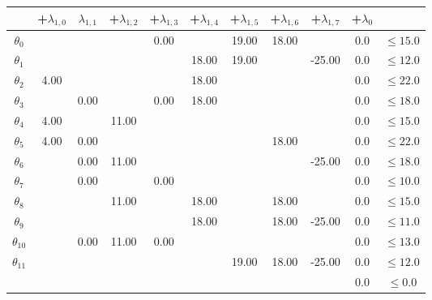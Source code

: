 \documentclass{article}
\begin{document}
    \begin{figure}
        \begin{tabular}{ |c|c |c |c |c |c |c |c |c |c |c| }
            \hline
            & +$\lambda_{1,0}$ & $\lambda_{1,1}$ & +$\lambda_{1,2}$ & +$\lambda_{1,3}$ & +$\lambda_{1,4}$ & +$\lambda_{1,5}$ & +$\lambda_{1,6}$ & +$\lambda_{1,7}$  & +$\lambda_{0}$ &  \\
            \hline
            \rowcolor{red!20}
            $\theta_{0}$ && & & 0.00 && 19.00 &18.00 && 0.0& $\leq 15.0$ \\
            $\theta_{1}$ && & & & 18.00 &19.00 && -25.00 &0.0& $\leq 12.0$ \\
            $\theta_{2}$ &4.00 && & & 18.00 && & & 0.0& $\leq 22.0$ \\
            $\theta_{3}$ && 0.00 && 0.00 &18.00 && & & 0.0& $\leq 18.0$ \\
            $\theta_{4}$ &4.00 && 11.00 && & & & & 0.0& $\leq 15.0$ \\
            \rowcolor{blue!20}
            $\theta_{5}$ &4.00 &0.00 && & & & 18.00 && 0.0& $\leq 22.0$ \\
            \rowcolor{blue!20}
            $\theta_{6}$ && 0.00 &11.00 && & & & -25.00 &0.0& $\leq 18.0$ \\
            $\theta_{7}$ && 0.00 && 0.00 && & & & 0.0& $\leq 10.0$ \\
            \rowcolor{red!20}
            $\theta_{8}$ && & 11.00 && 18.00 && 18.00 && 0.0& $\leq 15.0$ \\
            $\theta_{9}$ && & & & 18.00 && 18.00 &-25.00 &0.0& $\leq 11.0$ \\
            $\theta_{10}$ && 0.00 &11.00 &0.00 && & & & 0.0& $\leq 13.0$ \\
            $\theta_{11}$ && & & & & 19.00 &18.00 &-25.00 &0.0& $\leq 12.0$ \\
            && & & & &  && & 0.0 & $\leq 0.0$ \\
            \hline
        \end{tabular}
        \caption{}
        \label{fig:collision}
    \end{figure}
\end{document}
